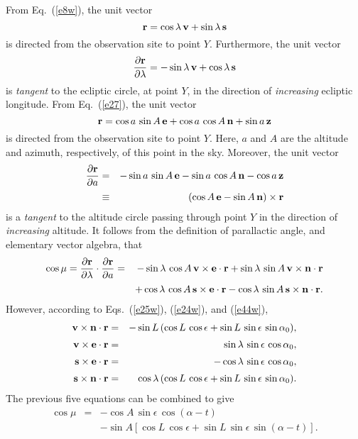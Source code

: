 From Eq.~(\ref{e8w}), the unit vector
\begin{equation}\label{e44w}
{\bf r} = \cos\lambda\,{\bf v} + \sin \lambda\,{\bf s}
\end{equation}
is directed from the observation site to point $Y$. 
Furthermore, the unit vector
\begin{equation}
\frac{\partial {\bf r}}{\partial \lambda} = -\sin\lambda\,{\bf v} + \cos\lambda\,{\bf s}
\end{equation}
is {\em tangent}\/ to the ecliptic circle, at  point $Y$, in the direction of {\em increasing}\/ ecliptic longitude. 
From  Eq.~(\ref{e27}), the unit vector
\begin{equation}
{\bf r} = \cos a\,\sin A\,{\bf e}+ \cos a\,\cos A\,{\bf n} + \sin a \,{\bf z}
\end{equation}
is directed from the observation site to point $Y$. Here, $a$ and $A$ are the  altitude  and azimuth, respectively, of this
point in the sky. Moreover,
the unit vector
\begin{eqnarray}
\frac{\partial {\bf r}}{\partial a} &=& -\sin a\,\sin A\,{\bf e}-\sin a\,\cos A\,{\bf n} -\cos a\,{\bf z}\nonumber\\[0.5ex]
&\equiv& (\cos A \,{\bf e}-\sin A\,{\bf n})\times {\bf r}
\end{eqnarray}
is a {\em tangent}\/ to the altitude circle passing through point $Y$ in the direction of {\em increasing}\/ altitude. It
follows from the definition of parallactic angle, and elementary vector algebra, that
\begin{eqnarray}
\cos \mu = \frac{\partial{\bf r}}{\partial\lambda}\cdot\frac{\partial {\bf r}}{\partial a} &=& -\sin\lambda
\,\cos A\,{\bf v}\times{\bf e}\cdot{\bf r}+\sin\lambda\,\sin A\,{\bf v}\times{\bf n}\cdot{\bf r}\nonumber\\[0.5ex]
&&+\cos\lambda\,\cos A\,{\bf s}\times {\bf e}\cdot{\bf r} -\cos\lambda\,\sin A\,{\bf s}\times {\bf n}\cdot{\bf r}.
\end{eqnarray}
However, according to Eqs.~(\ref{e25w}), (\ref{e24w}), and (\ref{e44w}),
\begin{eqnarray}
{\bf v}\times {\bf n}\cdot{\bf r}&=&-\sin L\,(\cos L\,\cos\epsilon + \sin L\,\sin \epsilon\,\sin \alpha_0),\\[0.5ex]
{\bf v}\times {\bf e}\cdot{\bf r} &=&\sin\lambda\,\sin \epsilon\,\cos\alpha_0,\\[0.5ex]
{\bf s}\times {\bf e}\cdot{\bf r} &=&-\cos\lambda\,\sin \epsilon\,\cos\alpha_0,\\[0.5ex]
{\bf s}\times {\bf n}\cdot{\bf r} &=&\cos\lambda\,(\cos L\,\cos\epsilon + \sin L\,\sin\epsilon\,\sin\alpha_0).
\end{eqnarray}
The previous five equations can be combined to give
\begin{eqnarray}\label{e45w}
\cos \mu &=&-\cos A\,\sin\epsilon\,\cos(\alpha-t)\nonumber\\[0.5ex]
&&-\sin A\left[\cos L\,\cos\epsilon + \sin L\,\sin\epsilon\,\sin(\alpha-t)\right].
\end{eqnarray}

